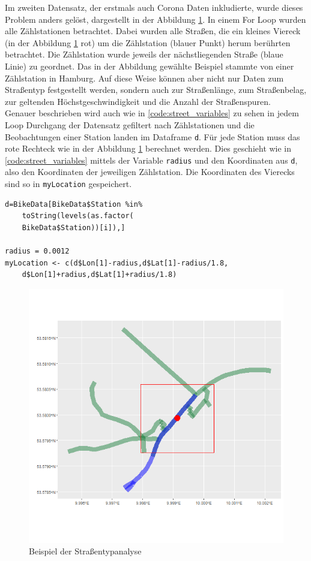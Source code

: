 \documentclass[a4paper,12pt]{thesis}
\begin{document}
Im zweiten Datensatz, der erstmals auch Corona Daten inkludierte, wurde dieses Problem anders gelöst, dargestellt in der Abbildung \ref{Straßencheck}. In einem For Loop wurden alle Zählstationen betrachtet. Dabei wurden alle Straßen, die ein kleines Viereck (in der Abbildung \ref{Straßencheck} rot) um die Zählstation (blauer Punkt) herum berührten betrachtet. Die Zählstation wurde jeweils der nächstliegenden Straße (blaue Linie) zu geordnet. Das in der Abbildung gewählte Beispiel stammte von einer Zählstation in Hamburg. Auf diese Weise können aber nicht nur Daten zum Straßentyp festgestellt werden, sondern auch zur Straßenlänge, zum Straßenbelag, zur geltenden Höchstgeschwindigkeit und die Anzahl der Straßenspuren.\\

Genauer beschrieben wird auch wie in \ref{code:street_variables} zu sehen in jedem Loop Durchgang der Datensatz gefiltert nach Zählstationen und die Beobachtungen einer Station landen im Dataframe \lstinline|d|. Für jede Station muss das rote Rechteck wie in der Abbildung \ref{Straßencheck} berechnet werden. Dies geschieht wie in \ref{code:street_variables} mittels der Variable \lstinline|radius| und den Koordinaten aus \lstinline|d|, also den Koordinaten der jeweiligen Zählstation. Die Koordinaten des Vierecks sind so in \lstinline|myLocation| gespeichert.

\begin{lstlisting}[caption={Berechnung der Straßenvariablen},label=code:street_variables]
d=BikeData[BikeData$Station %in% 
	toString(levels(as.factor(
	BikeData$Station))[i]),]

radius = 0.0012
myLocation <- c(d$Lon[1]-radius,d$Lat[1]-radius/1.8,   
	d$Lon[1]+radius,d$Lat[1]+radius/1.8)
\end{lstlisting}

\begin{figure}[!ht]
	\centering
	\includegraphics[width=\textwidth]{Plots/Station_5564_1.png}
	\caption{Beispiel der Straßentypanalyse}
	\label{Straßencheck}
\end{figure}
\end{document}
